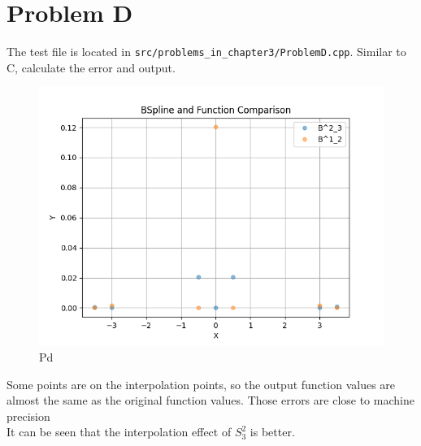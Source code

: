\documentclass[a4paper]{article}
\begin{document}
    \section*{Problem D}
    The test file is located in \texttt{src/problems\_in\_chapter3/ProblemD.cpp}.
    Similar to C, calculate the error and output.
    \begin{figure}[H] 
        \centering
        \includegraphics{../figure/Pd.png} 
        \caption{Pd} 
    \end{figure}
    Some points are on the interpolation points, so the output function values are almost the same as the original function values.
    Those errors are close to machine precision\\
    It can be seen that the interpolation effect of $S^2_3$ is better.
    
\end{document}
